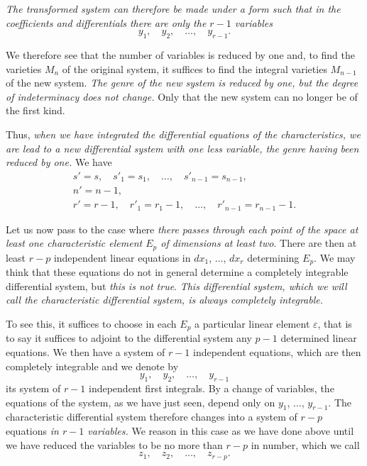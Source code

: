 \documentclass[leqno,11pt]{book}
\makeatletter
\theoremstyle{shape1}
\theoremstyle{shapesmall}
\let\old@epsilon\epsilon
\let\old@varepsilon\varepsilon
\let\epsilon\old@varepsilon
\let\varepsilon\old@epsilon
\makeatother
\begin{document}
\emph{The transformed system can therefore be made under a form such that in the coefficients and differentials there are only the $r-1$ variables}
\[
y_{1},\quad y_{2},\quad\dots,\quad y_{r-1}.
\]

We therefore see that the number of variables is reduced by one and, to find the varieties $M_{n}$ of the original system, it suffices to find the integral varieties $M_{n-1}$ of the new system. \emph{The genre of the new system is reduced by one, but the degree of indeterminacy does not change.} Only that the new system can no longer be of the first kind.

Thus, \emph{when we have integrated the differential equations of the characteristics, we are lead to a new differential system with one less variable, the genre having been reduced by one.} We have
\begin{gather*}
  s'=s,\quad s'_{1}=s_{1},\quad\dots,\quad s'_{n-1}=s_{n-1},\\
  n'=n-1,\\
  r'=r-1,\quad r'_{1}=r_{1}-1,\quad\dots,\quad r'_{n-1}=r_{n-1}-1.
\end{gather*}

Let us now pass to the case where \emph{there passes through each point of the space at least one characteristic element $E_{p}$ of dimensions at least two}. There are then at least $r-p$ independent linear equations in $dx_{1}$, $\dots$, $dx_{r}$ determining $E_{p}$. We may think that these equations do not in general determine a completely integrable differential system, but \emph{this is not true}. \emph{This differential system, which we will call the \emph{characteristic} differential system, is always completely integrable.}

To see this, it suffices to choose in each $E_{p}$ a particular linear element $\epsilon$, that is to say it suffices to adjoint to the differential system any $p-1$ determined linear equations. We then have a system of $r-1$ independent equations, which are then completely integrable and we denote by
\[
y_{1},\quad y_{2},\quad\dots,\quad y_{r-1}
\]
its system of $r-1$ independent first integrals. By a change of variables, the equations of the system, as we have just seen, depend only on $y_{1}$, $\dots$, $y_{r-1}$. The characteristic differential system therefore changes into a system of $r-p$ equations \emph{in $r-1$ variables.} We reason in this case as we have done above until we have reduced the variables to be no more than $r-p$ in number, which we call
\[
z_{1},\quad z_{2},\quad\dots,\quad z_{r-p}.
\]
\end{document}

